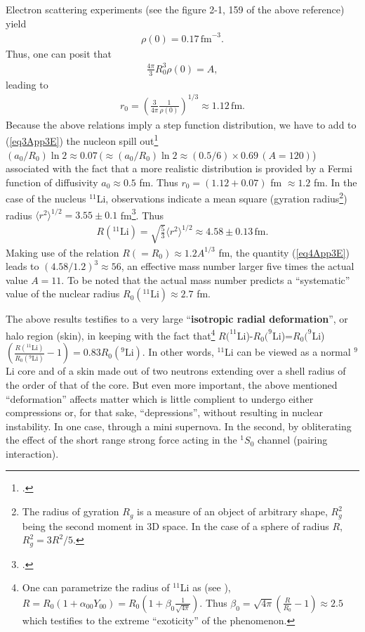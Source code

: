 \begin{subappendices}
Electron scattering experiments (see the figure 2-1, 159 of the above reference) yield
\begin{align}
\rho(0)=0.17\,\text{fm}^{-3}.
\end{align}
Thus, one can posit that
\begin{align}
\frac{4\pi}{3}R_0^3\rho(0)=A,
\end{align}
leading to
\begin{align}\label{eq3App3E}
r_0=\left(\frac{3}{4\pi}\frac{1}{\rho(0)}\right)^{1/3}\approx 1.12\,\text{fm}.
\end{align}
Because the above relations imply a step function distribution, we have to add to (\ref{eq3App3E}) the nucleon spill out\footnote{\cite{Bertsch:05}.} $(a_0/R_0)\ln 2\approx 0.07\, (\approx(a_0/R_0)\ln 2\approx (0.5/6)\times 0.69\, (A=120)$) associated with the fact that a more realistic distribution is provided by a Fermi function of diffusivity $a_0\approx 0.5$ fm. Thus $r_0=(1.12+0.07)$ fm $\approx 1.2$ fm. In the case of the nucleus $^{11}$Li, observations indicate a mean square (gyration radius\footnote{The radius of gyration $R_g$ is a measure of an object of arbitrary shape, $R^2_g$ being the second moment in 3D space. In the case of a sphere of radius $R$, $R^2_g=3R^2/5$.}) radius $\langle r^2\rangle^{1/2}=3.55\pm 0.1$ fm\footnote{\cite{Kobayashi:89}.}. Thus
\begin{align}\label{eq4App3E}
R(^{11}\text{Li})=\sqrt{\frac{5}{3}}\langle r^2\rangle^{1/2}\approx 4.58\pm 0.13\,\text{fm}.
\end{align}
Making use of the relation $R(=R_0)\approx1.2 A^{1/3}$ fm, the quantity (\ref{eq4App3E}) leads to $(4.58/1.2)^3\approx56$, an effective mass number larger five times the actual value $A=11$. To be noted that the actual mass number predicts a ``systematic'' value of the nuclear radius $R_0(^{11}\text{Li})\approx 2.7$ fm.


The above results testifies to a very large ``\textbf{isotropic radial deformation}'', or halo region (skin), in keeping with the fact that\footnote{One can parametrize the radius of $^{11}$Li as (see \cite{Bohr:75}), $R=R_0(1+\alpha_{00}Y_{00})=R_0(1+\beta_{0}\frac{1}{\sqrt{4\pi}})$. Thus $\beta_0=\sqrt{4\pi}(\frac{R}{R_0}-1)\approx 2.5$ which testifies to the extreme ``exoticity'' of the phenomenon.} $R(^{11}$Li)-$R_0(^{9}$Li)=$R_0(^{9}$Li)$(\frac{R(^{11}\text{Li})}{R_0(^9\text{Li})}-1)=0.83R_0(^9\text{Li})$. In other words, $^{11}$Li can be viewed as a normal $^{9}$Li core and of a skin made out of two neutrons   extending over a shell radius of the order of that of the core. But even more important, the above mentioned ``deformation'' affects matter which is little complient to undergo either compressions or, for that sake, ``depressions'', without resulting in nuclear instability. In one case, through a mini supernova. In the second, by obliterating the effect of the short range strong force acting in the $^1S_0$ channel (pairing interaction).



\end{subappendices}
